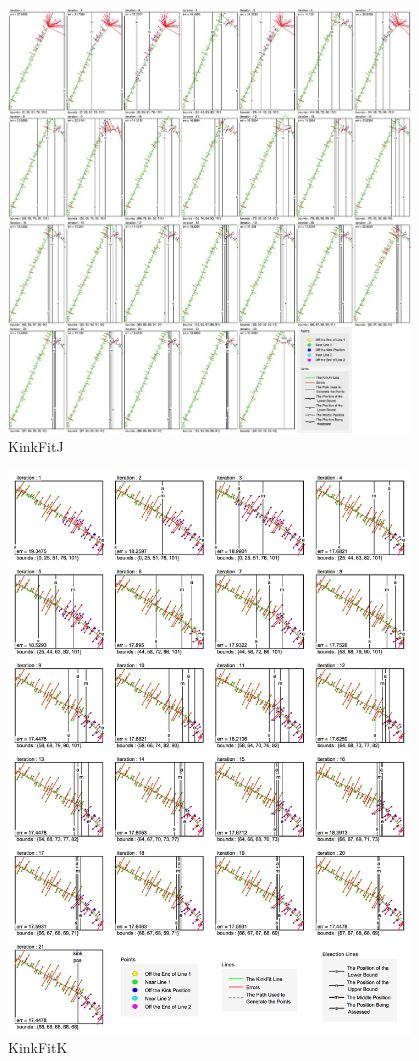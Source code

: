 \begin{figure}[h!]
  \centering
    \includegraphics[width=0.95\textwidth]{Chapter4/Figs/KinkFit_J.jpg}
    \caption{KinkFitJ}\label{fig:KinkFitJ}
\end{figure}

\begin{figure}[h!]
  \centering
    \includegraphics[width=0.95\textwidth]{Chapter4/Figs/KinkFit_K.jpg}
    \caption{KinkFitK}\label{fig:KinkFitK}
\end{figure}

